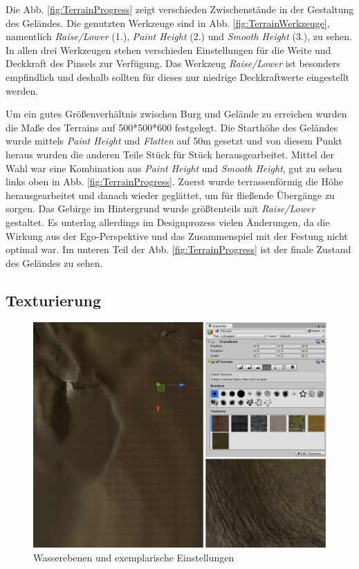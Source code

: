 Die Abb. \ref{fig:TerrainProgress} zeigt verschieden Zwischenstände in der Gestaltung des Geländes. Die genutzten Werkzeuge sind in Abb. \ref{fig:TerrainWerkzeuge}, namentlich \textit{Raise/Lower} (1.), \textit{Paint Height} (2.) und \textit{Smooth Height} (3.), zu sehen. In allen drei Werkzeugen stehen verschieden Einstellungen für die Weite und Deckkraft des Pinsels zur Verfügung. Das Werkzeug \textit{Raise/Lower} ist besonders empfindlich und deshalb sollten für dieses nur niedrige Deckkraftwerte eingestellt werden.

Um ein gutes Größenverhältnis zwischen Burg und Gelände zu erreichen wurden die Maße des Terrains auf 500*500*600 festgelegt. Die Starthöhe des Geländes wurde mittels \textit{Paint Height} und \textit{Flatten} auf 50m gesetzt und von diesem Punkt heraus wurden die anderen Teile Stück für Stück herausgearbeitet. Mittel der Wahl war eine Kombination aus \textit{Paint Height} und \textit{Smooth Height}, gut zu sehen links oben in Abb. \ref{fig:TerrainProgress}. Zuerst wurde terrassenförmig die Höhe herausgearbeitet und danach wieder geglättet, um für fließende Übergänge zu sorgen. Das Gebirge im Hintergrund wurde größtenteils mit \textit{Raise/Lower} gestaltet. Es unterlag allerdings im Designprozess vielen Änderungen, da die Wirkung aus der Ego-Perspektive und das Zusammenspiel mit der Festung nicht optimal war. Im unteren Teil der Abb. \ref{fig:TerrainProgress} ist der finale Zustand des Geländes zu sehen.

\subsection{Texturierung}
\begin{figure}[h]
	\centering
	\includegraphics[width=0.95\linewidth]{Abbildungen/Unity/Texture}
	\caption{Wasserebenen und exemplarische Einstellungen}
	\label{fig:Textures}
\end{figure}

